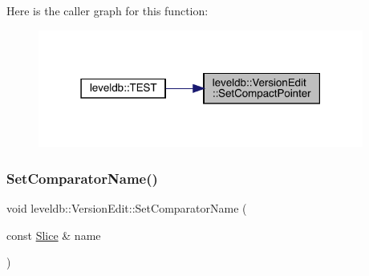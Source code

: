 Here is the caller graph for this function\+:
\nopagebreak
\begin{figure}[H]
\begin{center}
\leavevmode
\includegraphics[width=303pt]{classleveldb_1_1_version_edit_ac9b26dfba1188705d7fc4deaf047271c_icgraph}
\end{center}
\end{figure}
\mbox{\label{classleveldb_1_1_version_edit_ab562147cdd82b184e86e88bd375a718c}} 
\subsubsection{\texorpdfstring{SetComparatorName()}{SetComparatorName()}}
{\footnotesize\ttfamily void leveldb\+::\+Version\+Edit\+::\+Set\+Comparator\+Name (\begin{DoxyParamCaption}\item[{const \mbox{\hyperlink{classleveldb_1_1_slice}{Slice}} \&}]{name }\end{DoxyParamCaption})\hspace{0.3cm}{\ttfamily [inline]}}

